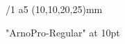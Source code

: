\fontfam[ebgaramond]
\typosize[11/22]

\margins/1 a5 (10,10,20,25)mm

\footlinedist=40pt

\parindent=0pt\relax

\newtoks\linetocenter

\def\startpoem{%
	\vfil\break
	\bgroup
	\obeylines
	\leftskip0pt \rightskip=\leftskip
	\smash{\centerline{\font\debgaramond "EBGaramond12-Regular" at 12pt\debgaramond \char"2766\relax}}
	\vskip\baselineskip
	\setbox0=\hbox{\the\linetocenter}\relax
	\leftskip=\dimexpr(\hsize-\wd0)/2\relax
}

\def\stoppoem{%
	\egroup
}

\font\arnopro "ArnoPro-Regular" at 10pt \arnopro
